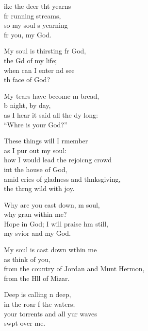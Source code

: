 \settowidth{\versewidth}{from the country of Jordan and Mount Hermon, *}
\begin{psalmverse}%
  \begin{patverse}
ike the deer tht yearns\Med\\
fr running streams,\\
so my soul \pointup{\i}s yearning\Med\\
fr you, my God.

My soul is thirsting fr God,\Med\\
the Gd of my life;\\
when can I enter nd see\Med\\
th face of God?

My tears have become m bread,\Med\\
b night, by day,\\
as I hear it said all the dy long:\Med\\
“Whre is your God?”

These things will I rmember\Med\\
as I pur out my soul:\\
how I would lead the rejoic\pointup{\i}ng crowd\Med\\
int the house of God,\\
amid cries of gladness and thnksgiving,\Med\\
the thrng wild with joy.

Why are you cast down, m soul,\Med\\
why gran within me?\\
Hope in God; I will praise h\pointup{\i}m still,\Med\\
my svior and my God.

My soul is cast down w\pointup{\i}thin me\Med\\
as  think of you,\\
from the country of Jordan and Munt Hermon,\Med\\
from the Hll of Mizar.

Deep is calling n deep,\Med\\
in the roar f the waters;\\
your torrents and all yur waves\Med\\
swpt over me.


\end{patverse}
\end{psalmverse}
